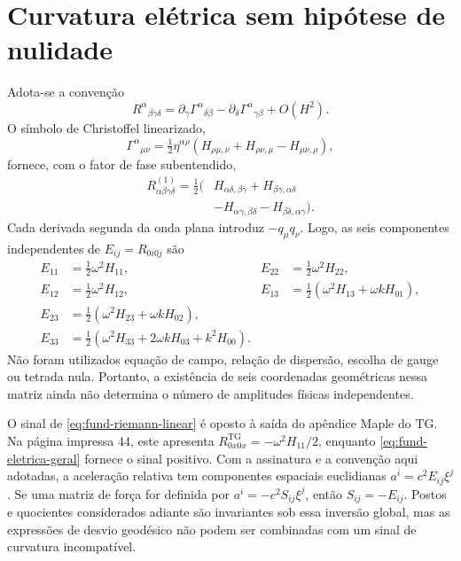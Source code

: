 \section{Curvatura elétrica sem hipótese de nulidade}

Adota-se a convenção
\begin{equation}
 R^\alpha{}_{\beta\gamma\delta}
 =\partial_\gamma\Gamma^\alpha{}_{\delta\beta}
  -\partial_\delta\Gamma^\alpha{}_{\gamma\beta}+O(H^2).
 \label{eq:fund-riemann-convencao}
\end{equation}
O símbolo de Christoffel linearizado,
\begin{equation}
 \Gamma^\alpha{}_{\mu\nu}
 =\tfrac12\eta^{\alpha\rho}
  (H_{\rho\mu,\nu}+H_{\rho\nu,\mu}-H_{\mu\nu,\rho}),
 \label{eq:fund-christoffel}
\end{equation}
fornece, com o fator de fase subentendido,
\begin{equation}
 \begin{aligned}
 R_{\alpha\beta\gamma\delta}^{(1)}
 =\tfrac12\big(&H_{\alpha\delta,\beta\gamma}
             +H_{\beta\gamma,\alpha\delta}\\
             &-H_{\alpha\gamma,\beta\delta}
             -H_{\beta\delta,\alpha\gamma}\big).
 \end{aligned}
 \label{eq:fund-riemann-linear}
\end{equation}
Cada derivada segunda da onda plana introduz \(-q_\mu q_\nu\).
Logo, as seis componentes independentes de
\(E_{ij}=R_{0i0j}\) são
\begin{equation}
 \begin{aligned}
 E_{11}&=\tfrac12\omega^2H_{11},
 &E_{22}&=\tfrac12\omega^2H_{22},\\
 E_{12}&=\tfrac12\omega^2H_{12},
 &E_{13}&=\tfrac12(\omega^2H_{13}+\omega kH_{01}),\\
 E_{23}&=\tfrac12(\omega^2H_{23}+\omega kH_{02}),\\
 E_{33}&=\tfrac12(\omega^2H_{33}+2\omega kH_{03}+k^2H_{00}).
 \end{aligned}
 \label{eq:fund-eletrica-geral}
\end{equation}
Não foram utilizados equação de campo, relação de dispersão, escolha
de gauge ou tetrada nula. Portanto, a existência de seis coordenadas
geométricas nessa matriz ainda não determina o número de amplitudes
físicas independentes.

O sinal de \eqref{eq:fund-riemann-linear} é oposto à saída do apêndice
Maple do TG. Na página impressa 44, este apresenta
\(R_{0x0x}^{\mathrm{TG}}=-\omega^2H_{11}/2\), enquanto
\eqref{eq:fund-eletrica-geral} fornece o sinal positivo. Com a
assinatura e a convenção aqui adotadas, a aceleração relativa tem
componentes espaciais euclidianas
\(a^i=c^2E_{ij}\xi^j\). Se uma matriz de força for definida por
\(a^i=-c^2S_{ij}\xi^j\), então \(S_{ij}=-E_{ij}\). Postos e
quocientes considerados adiante são invariantes sob essa inversão
global, mas as expressões de desvio geodésico não podem ser combinadas
com um sinal de curvatura incompatível.

